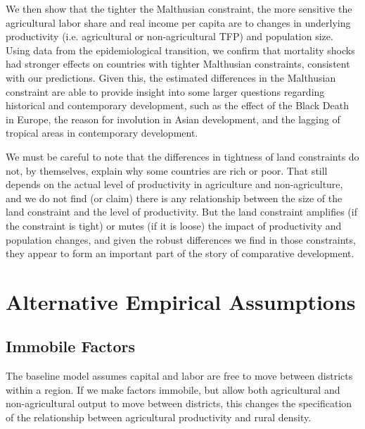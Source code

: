 \documentclass[11pt]{article}
\begin{document}
We then show that the tighter the Malthusian constraint, the more sensitive the agricultural labor share and real income per capita are to changes in underlying productivity (i.e. agricultural or non-agricultural TFP) and population size. Using data from the epidemiological transition, we confirm that mortality shocks had stronger effects on countries with tighter Malthusian constraints, consistent with our predictions. Given this, the estimated differences in the Malthusian constraint are able to provide insight into some larger questions regarding historical and contemporary development, such as the effect of the Black Death in Europe, the reason for involution in Asian development, and the lagging of tropical areas in contemporary development. 

We must be careful to note that the differences in tightness of land constraints do not, by themselves, explain why some countries are rich or poor. That still depends on the actual level of productivity in agriculture and non-agriculture, and we do not find (or claim) there is any relationship between the size of the land constraint and the level of productivity. But the land constraint amplifies (if the constraint is tight) or mutes (if it is loose) the impact of productivity and population changes, and given the robust differences we find in those constraints, they appear to form an important part of the story of comparative development.

\newpage
\clearpage

\setcounter{section}{0}
\renewcommand{\thesection}{Appendix \Alph{section}}

\singlespacing

\section{Alternative Empirical Assumptions}\label{APP_alt}

\subsection{Immobile Factors}
The baseline model assumes capital and labor are free to move between districts within a region. If we make factors immobile, but allow both agricultural and non-agricultural output to move between districts, this changes the specification of the relationship between agricultural productivity and rural density. 
\end{document}
